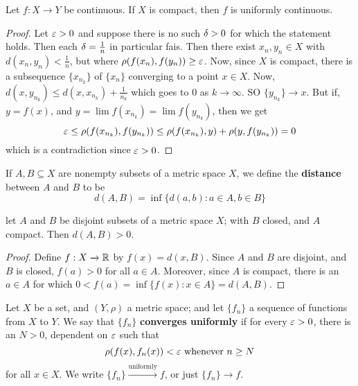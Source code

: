 \begin{theorem}\label{2.5.9}
    Let $f:X \xrightarrow{} Y$ be continuous. If $X$ is compact, then  $f$ is
    uniformly continuous.
\end{theorem}
\begin{proof}
    Let $\varepsilon>0$ and suppose there is no such  $\delta>0$ for which the statement
    holds. Then each  $\delta=\frac{1}{n}$ in particular fais. Then there exist
    $x_n,y_n \in X$ with  $d(x_n,y_n)<\frac{1}{n}$, but where
    $\rho(f(x_n),f(y_n)) \geq \varepsilon$. Now, since $X$ is compact, there is a
    subsequence  $\{x_{n_k}\}$ of $\{x_n\}$ converging to a point $x \in X$.
    Now,  $d(x,y_{n_k}) \leq d(x,x_{n_k})+\frac{1}{n_k}$ which goes to $0$ as
    $k \xrightarrow{} \infty$. SO $\{y_{n_k}\} \xrightarrow{} x$. But if,
    $y=f(x)$, and $y=\lim{f(x_{n_k})}=\lim{f(y_{n_k})}$, then we get
    \begin{equation*}
        \varepsilon \leq \rho(f(x_{n_k}),f(y_{n_k})) \leq
        \rho(f(x_{n_k}),y)+\rho(y,f(y_{n_k}))=0
    \end{equation*}
    which is a contradiction since $\varepsilon>0$.
\end{proof}

\begin{definition}
    If $A,B \subseteq X$ are nonempty subsets of a metric space  $X$, we define
    the  \textbf{distance} between $A$ and $B$ to be
    \begin{equation*}
        d(A,B)=\inf{\{d(a,b) : a \in A, b \in B\}}
    \end{equation*}
\end{definition}

\begin{theorem}\label{2.5.10}
    let $A$ and  $B$ be disjoint subsets of a metric space  $X$; with  $B$
    closed, and  $A$ compact. Then  $d(A,B)>0$.
\end{theorem}
\begin{proof}
    Define $f:X \xrightarrow{} \mathbb{R}$ by $f(x)=d(x,B)$. Since $A$ and  $B$ are
    disjoint, and  $B$ is closed, $f(a)>0$ for all $a \in A$. Moreover, since
    $A$ is compact, there is an  $a \in A$ for which  $0<f(a)=\inf{\{f(x) : x
    \in A\}}=d(A,B)$.
\end{proof}

\begin{definition}
    Let $X$ be a set, and $(Y,\rho)$ a metric space; and let $\{f_n\}$ a
    sequence of functions from $X$ to  $Y$. We say that  $\{f_n\}$
    \textbf{converges uniformly} if for every $\varepsilon>0$, there is an  $N>0$,
    dependent on  $\varepsilon$ such that
    \begin{equation*}
        \rho(f(x),f_n(x))<\varepsilon \text{ whenever } n \geq N
    \end{equation*}
    for all $x \in X$. We write $\{f_n\} \xrightarrow{\text{uniformly}} f$, or
    just $\{f_n\} \xrightarrow{} f$.
\end{definition}

